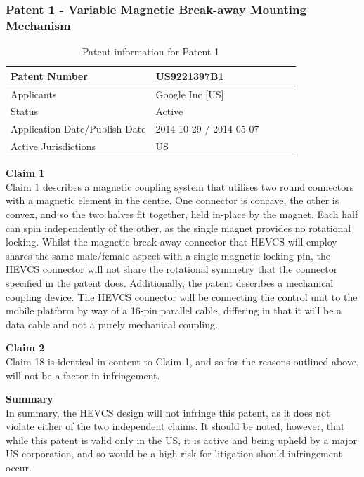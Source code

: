 \documentclass [12pt]{article}
\begin{document}
\subsubsection{Patent 1 - Variable Magnetic Break-away Mounting Mechanism}
\begin{table}[H]
    \centering
    \setlength{\arrayrulewidth}{1.5pt}
    \begin{tabular}{|p{0.5\linewidth}|p{0.5\linewidth}|}
    \hline
    Patent Number & \href{https://worldwide.espacenet.com/patent/search/family/054932262/publication/US9221397B1?q=US9221397B1}{US9221397B1}\\
    \hline
    Applicants & Google Inc [US]\\
    \hline
    Status & Active\\
    \hline
    Application Date/Publish Date & 2014-10-29 / 2014-05-07\\
    \hline
    Active Jurisdictions & US\\
    \hline
    \end{tabular}
    \caption{Patent information for Patent 1}
    \label{table:mag_con1}
\end{table}
\textbf{Claim 1}\\
Claim 1 describes a magnetic coupling system that utilises two round connectors with a magnetic element in the centre. One connector is concave, the other is convex, and so the two halves fit together, held in-place by the magnet. Each half can spin independently of the other, as the single magnet provides no rotational locking.
Whilst the magnetic break away connector that HEVCS will employ shares the same male/female aspect with a single magnetic locking pin, the HEVCS connector will not share the rotational symmetry that the connector specified in the patent does. Additionally, the patent describes a mechanical coupling device. The HEVCS connector will be connecting the control unit to the mobile platform by way of a 16-pin parallel cable, differing in that it will be a data cable and not a purely mechanical coupling.

\textbf{Claim 2}\\
Claim 18 is identical in content to Claim 1, and so for the reasons outlined above, will not be a factor in infringement.

\textbf{Summary}\\
In summary, the HEVCS design will not infringe this patent, as it does not violate either of the two independent claims. It should be noted, however, that while this patent is valid only in the US, it is active and being upheld by a major US corporation, and so would be a high risk for litigation should infringement occur.
\end{document}

